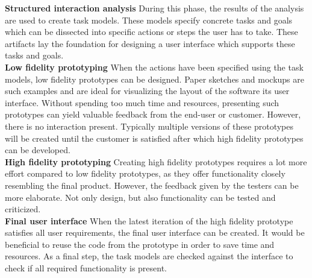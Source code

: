         \noindent\textbf{Structured interaction analysis} During this phase, the results of the analysis are used to create task models. These models specify concrete tasks and goals which can be dissected into specific actions or steps the user has to take. These artifacts lay the foundation for designing a user interface which supports these tasks and goals.\\

        \noindent\textbf{Low fidelity prototyping} When the actions have been specified using the task models, low fidelity prototypes can be designed. Paper sketches and mockups are such examples and are ideal for visualizing the layout of the software its user interface. Without spending too much time and resources, presenting such prototypes can yield valuable feedback from the end-user or customer. However, there is no interaction present. Typically multiple versions of these prototypes will be created until the customer is satisfied after which high fidelity prototypes can be developed.\\

        \noindent\textbf{High fidelity prototyping} Creating high fidelity prototypes requires a lot more effort compared to low fidelity prototypes, as they offer functionality closely resembling the final product. However, the feedback given by the testers can be more elaborate. Not only design, but also functionality can be tested and criticized.\\

        \noindent\textbf{Final user interface} When the latest iteration of the high fidelity prototype satisfies all user requirements, the final user interface can be created. It would be beneficial to reuse the code from the prototype in order to save time and resources. As a final step, the task models are checked against the interface to check if all required functionality is present.\\


        

        


